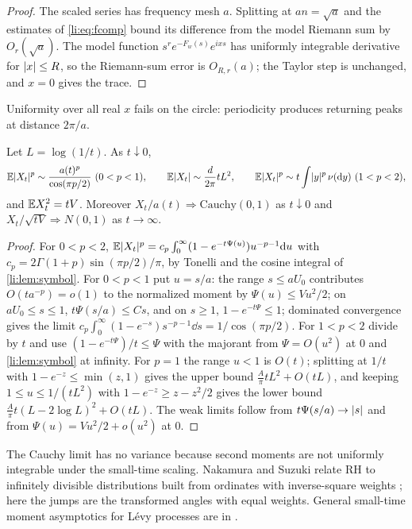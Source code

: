 \begin{proof}
The scaled series has frequency mesh $a$. Splitting at $an=\sqrt a$ and the estimates of
\eqref{li:eq:fcomp} bound its difference from the model Riemann sum by $O_r(\sqrt a)$. The model
function $s^re^{-F_w(s)}e^{ixs}$ has uniformly integrable derivative for $\lvert x\rvert\le R$, so the
Riemann-sum error is $O_{R,r}(a)$; the Taylor step is unchanged, and $x=0$ gives the trace.
\end{proof}

Uniformity over all real $x$ fails on the circle: periodicity produces returning peaks at distance
$2\pi/a$.

\begin{theorem}\label{li:thm:moments}
Let $L=\log(1/t)$. As $t\downarrow0$,
\[
 \mathbb{E}\lvert X_t\rvert^p\sim\frac{a(t)^p}{\cos(\pi p/2)}\ (0<p<1),\qquad
 \mathbb{E}\lvert X_t\rvert\sim\frac d{2\pi}tL^2,\qquad
 \mathbb{E}\lvert X_t\rvert^p\sim t\int\lvert y\rvert^p\,\nu(\mathrm{d} y)\ (1<p<2),
\]
and $\mathbb{E} X_t^2=tV$. Moreover $X_t/a(t)\Rightarrow\mathrm{Cauchy}(0,1)$ as $t\downarrow0$ and
$X_t/\sqrt{tV}\Rightarrow N(0,1)$ as $t\to\infty$.
\end{theorem}

\begin{proof}
For $0<p<2$, $\mathbb{E}\lvert X_t\rvert^p=c_p\int_0^\infty(1-e^{-t\Psi(u)})u^{-p-1}\mathrm{d} u$ with
$c_p=2\Gamma(1+p)\sin(\pi p/2)/\pi$, by Tonelli and the cosine integral of \cref{li:lem:symbol}. For
$0<p<1$ put $u=s/a$: the range $s\le aU_0$ contributes $O(ta^{-p})=o(1)$ to the normalized moment by
$\Psi(u)\le Vu^2/2$; on $aU_0\le s\le1$, $t\Psi(s/a)\le Cs$, and on $s\ge1$, $1-e^{-t\Psi}\le1$;
dominated convergence gives the limit $c_p\int_0^\infty(1-e^{-s})s^{-p-1}\dd s=1/\cos(\pi p/2)$. For
$1<p<2$ divide by $t$ and use $(1-e^{-t\Psi})/t\le\Psi$ with the majorant from $\Psi=O(u^2)$ at $0$ and
\cref{li:lem:symbol} at infinity. For $p=1$ the range $u<1$ is $O(t)$; splitting at $1/t$ with
$1-e^{-z}\le\min(z,1)$ gives the upper bound $\frac A\pi tL^2+O(tL)$, and keeping
$1\le u\le1/(tL^2)$ with $1-e^{-z}\ge z-z^2/2$ gives the lower bound $\frac A\pi t(L-2\log L)^2+O(tL)$.
The weak limits follow from $t\Psi(s/a)\to\lvert s\rvert$ and from $\Psi(u)=Vu^2/2+o(u^2)$ at $0$.
\end{proof}

The Cauchy limit has no variance because second moments are not uniformly integrable under the
small-time scaling. Nakamura and Suzuki relate RH to infinitely divisible distributions built from
ordinates with inverse-square weights \cite{NakamuraSuzuki2023Infinitely}; here the jumps are the
transformed angles with equal weights. General small-time moment asymptotics for L\'evy processes are
in \cite{FigueroaLopez2008Small}.

